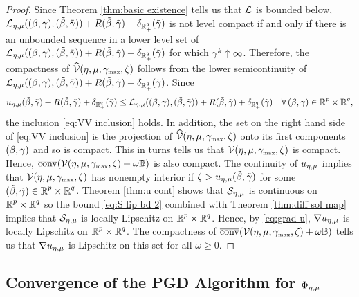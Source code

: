 \begin{proof}
Since Theorem \ref{thm:basic existence} tells us that
$\LL$ is bounded below, 
$\LL_{\emu}(\bg,\tbg) + R\tbg+\del_{\R^q_+}(\tgam)$ is not level compact
if and only if there is an unbounded sequence
in a lower level set of 
$\LL_{\emu}(\bg,\tbg) + R\tbg+\del_{\R^q_+}(\tgam)$ 
for which $\gam^k\uparrow\infty$.
Therefore, the compactness of $\widehat\VV(\eta,\mu,\gammax,\zeta)$ 
follows from the lower semicontinuity of  
$\LL_{\emu}(\bg,\tbg) + R\tbg+\del_{\R^q_+}(\tgam)$.
Since
\[
\uemu\tbg + R\tbg+\del_{\Rqp}(\tgam)\le 
\LL_{\emu}(\bg,\tbg) + R\tbg+\del_{\R^q_+}(\tgam)\quad
\forall\, \bg\in\Rp\times\Rq,
\]
the inclusion \eqref{eq:VV inclusion} holds.
In addition, the set on the right hand side of \eqref{eq:VV inclusion}
is the projection of $\widehat\VV(\eta,\mu,\gammax,\zeta)$ onto
its
first components $\bg$ and so is compact. This in turns tells us that 
$\VV(\eta,\mu,\gammax,\zeta)$ is compact. Hence, 
$\clco(\VV(\eta,\mu,\gammax,\zeta)+\omega\uball)$
is also compact. The continuity of $\uemu$ implies that 
$\VV(\eta,\mu,\gammax,\zeta)$ has nonempty interior if
$\zeta>\uemu\tbg$ for some $\tbg\in\Rp\times\Rq$.
Theorem \ref{thm:u cont} shows that $\SS_\emu$ is continuous on 
$\Rp\times\Rq$ so the bound \eqref{eq:S lip bd 2} combined with 
Theorem \ref{thm:diff sol map} implies that $\SS_\emu$ is locally
Lipschitz on $\Rp\times\Rq$. Hence, by \eqref{eq:grad u},
$\nabla \uemu$ is locally Lipschitz on $\Rp\times\Rq$.
The compactness of 
$\clco(\VV(\eta,\mu,\gammax,\zeta)+\omega\uball)$
tells us that $\nabla \uemu$ is Lipschitz on
this set for all $\omega\ge 0$.
\end{proof}


\subsection{Convergence of the PGD Algorithm for $\Phi_\emu$}
\label{sec:convergence pgd}

